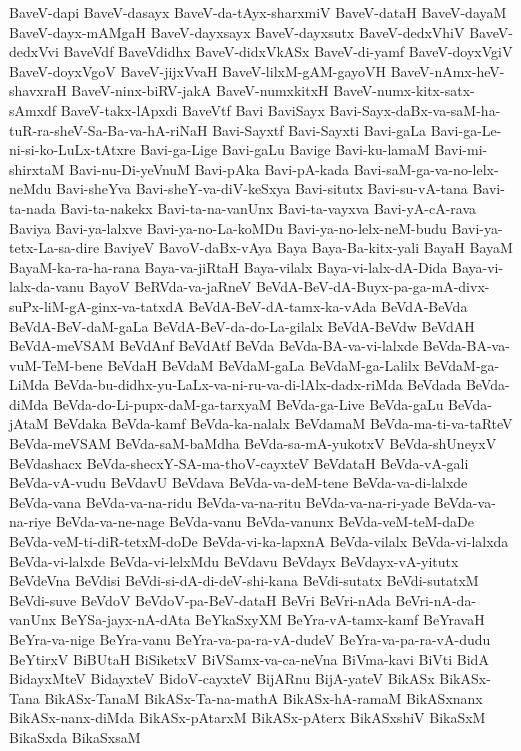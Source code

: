 {BaveV-dapi
BaveV-dasayx
BaveV-da-tAyx-sharxmiV
BaveV-dataH
BaveV-dayaM
BaveV-dayx-mAMgaH
BaveV-dayxsayx
BaveV-dayxsutx
BaveV-dedxVhiV
BaveV-dedxVvi
BaveVdf
BaveVdidhx
BaveV-didxVkASx
BaveV-di-yamf
BaveV-doyxVgiV
BaveV-doyxVgoV
BaveV-jijxVvaH
BaveV-lilxM-gAM-gayoVH
BaveV-nAmx-heV-shavxraH
BaveV-ninx-biRV-jakA
BaveV-numxkitxH
BaveV-numx-kitx-satx-sAmxdf
BaveV-takx-lApxdi
BaveVtf
Bavi
BaviSayx
Bavi-Sayx-daBx-va-saM-ha-tuR-ra-sheV-Sa-Ba-va-hA-riNaH
Bavi-Sayxtf
Bavi-Sayxti
Bavi-gaLa
Bavi-ga-Le-ni-si-ko-LuLx-tAtxre
Bavi-ga-Lige
Bavi-gaLu
Bavige
Bavi-ku-lamaM
Bavi-mi-shirxtaM
Bavi-nu-Di-yeVnuM
Bavi-pAka
Bavi-pA-kada
Bavi-saM-ga-va-no-lelx-neMdu
Bavi-sheYva
Bavi-sheY-va-diV-keSxya
Bavi-situtx
Bavi-su-vA-tana
Bavi-ta-nada
Bavi-ta-nakekx
Bavi-ta-na-vanUnx
Bavi-ta-vayxva
Bavi-yA-cA-rava
Baviya
Bavi-ya-lalxve
Bavi-ya-no-La-koMDu
Bavi-ya-no-lelx-neM-budu
Bavi-ya-tetx-La-sa-dire
BaviyeV
BavoV-daBx-vAya
Baya
Baya-Ba-kitx-yali
BayaH
BayaM
BayaM-ka-ra-ha-rana
Baya-va-jiRtaH
Baya-vilalx
Baya-vi-lalx-dA-Dida
Baya-vi-lalx-da-vanu
BayoV
BeRVda-va-jaRneV
BeVdA-BeV-dA-Buyx-pa-ga-mA-divx-suPx-liM-gA-ginx-va-tatxdA
BeVdA-BeV-dA-tamx-ka-vAda
BeVdA-BeVda
BeVdA-BeV-daM-gaLa
BeVdA-BeV-da-do-La-gilalx
BeVdA-BeVdw
BeVdAH
BeVdA-meVSAM
BeVdAnf
BeVdAtf
BeVda
BeVda-BA-va-vi-lalxde
BeVda-BA-va-vuM-TeM-bene
BeVdaH
BeVdaM
BeVdaM-gaLa
BeVdaM-ga-Lalilx
BeVdaM-ga-LiMda
BeVda-bu-didhx-yu-LaLx-va-ni-ru-va-di-lAlx-dadx-riMda
BeVdada
BeVda-diMda
BeVda-do-Li-pupx-daM-ga-tarxyaM
BeVda-ga-Live
BeVda-gaLu
BeVda-jAtaM
BeVdaka
BeVda-kamf
BeVda-ka-nalalx
BeVdamaM
BeVda-ma-ti-va-taRteV
BeVda-meVSAM
BeVda-saM-baMdha
BeVda-sa-mA-yukotxV
BeVda-shUneyxV
BeVdashacx
BeVda-shecxY-SA-ma-thoV-cayxteV
BeVdataH
BeVda-vA-gali
BeVda-vA-vudu
BeVdavU
BeVdava
BeVda-va-deM-tene
BeVda-va-di-lalxde
BeVda-vana
BeVda-va-na-ridu
BeVda-va-na-ritu
BeVda-va-na-ri-yade
BeVda-va-na-riye
BeVda-va-ne-nage
BeVda-vanu
BeVda-vanunx
BeVda-veM-teM-daDe
BeVda-veM-ti-diR-tetxM-doDe
BeVda-vi-ka-lapxnA
BeVda-vilalx
BeVda-vi-lalxda
BeVda-vi-lalxde
BeVda-vi-lelxMdu
BeVdavu
BeVdayx
BeVdayx-vA-yitutx
BeVdeVna
BeVdisi
BeVdi-si-dA-di-deV-shi-kana
BeVdi-sutatx
BeVdi-sutatxM
BeVdi-suve
BeVdoV
BeVdoV-pa-BeV-dataH
BeVri
BeVri-nAda
BeVri-nA-da-vanUnx
BeYSa-jayx-nA-dAta
BeYkaSxyXM
BeYra-vA-tamx-kamf
BeYravaH
BeYra-va-nige
BeYra-vanu
BeYra-va-pa-ra-vA-dudeV
BeYra-va-pa-ra-vA-dudu
BeYtirxV
BiBUtaH
BiSiketxV
BiVSamx-va-ca-neVna
BiVma-kavi
BiVti
BidA
BidayxMteV
BidayxteV
BidoV-cayxteV
BijARnu
BijA-yateV
BikASx
BikASx-Tana
BikASx-TanaM
BikASx-Ta-na-mathA
BikASx-hA-ramaM
BikASxnanx
BikASx-nanx-diMda
BikASx-pAtarxM
BikASx-pAterx
BikASxshiV
BikaSxM
BikaSxda
BikaSxsaM
}
